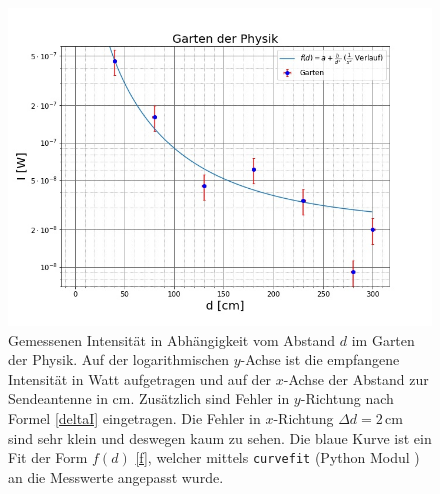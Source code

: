 \documentclass[titlepage,11pt,a4paper,ngerman]{article}
\begin{document}
\FloatBarrier

\begin{figure}[ht]
	\includegraphics[scale=0.55]{Bilder/Abstand-Garten.jpg}
	\centering
	\caption{Gemessenen Intensität in Abhängigkeit vom Abstand $d$ im Garten der Physik. Auf der logarithmischen $y$-Achse ist die empfangene Intensität in Watt aufgetragen und auf der $x$-Achse der Abstand zur Sendeantenne in cm. Zusätzlich sind Fehler in $y$-Richtung nach Formel \eqref{deltaI} eingetragen. Die Fehler in $x$-Richtung $\Delta d = 2\,$cm sind sehr klein und deswegen kaum zu sehen. Die blaue Kurve ist ein Fit der Form $f(d)$ \eqref{f}, welcher mittels \texttt{curvefit} (Python Modul \cite{curvescipy}) an die Messwerte angepasst wurde.}
	\label{Garten-A}
\end{figure}
\end{document}
